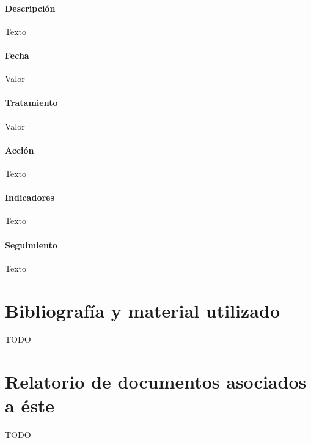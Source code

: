 \documentclass[10pt,a4paper]{article}
\begin{document}
				\paragraph{Descripción} Texto
				\paragraph{Fecha} Valor %
				\paragraph{Tratamiento} Valor %
				\paragraph{Acción} Texto %
				\paragraph{Indicadores} Texto %
				\paragraph{Seguimiento}	Texto %
	
	\appendix
		\section{Bibliografía y material utilizado}
			TODO %
			
		\section{Relatorio de documentos asociados a éste}
			TODO %
\end{document}
